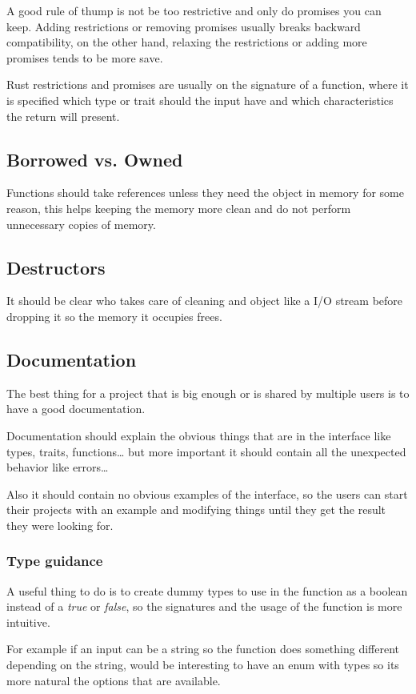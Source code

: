 A good rule of thump is not be too restrictive and only do promises you can keep.
Adding restrictions or removing promises usually breaks backward compatibility,
on the other hand, relaxing the restrictions or adding more promises tends to be more save.

Rust restrictions and promises are usually on the signature of a function,
where it is specified which type or trait should the input have and which characteristics the return will present.

\subsection{Borrowed vs. Owned}

Functions should take references unless they need the object in memory for some reason,
this helps keeping the memory more clean and do not perform unnecessary copies of memory.

\subsection{Destructors}

It should be clear who takes care of cleaning and object like a I/O stream before dropping it so the memory it occupies frees.

\subsection{Documentation}

The best thing for a project that is big enough or is shared by multiple users is to have a good documentation.

Documentation should explain the obvious things that are in the interface like types, traits, functions…
but more important it should contain all the unexpected behavior like errors…

Also it should contain no obvious examples of the interface,
so the users can start their projects with an example and modifying things until they get the result they were looking for.

\subsubsection{Type guidance}

A useful thing to do is to create dummy types to use in the function as a boolean instead of a \textit{true} or \textit{false},
so the signatures and the usage of the function is more intuitive.

For example if an input can be a string so the function does something different depending on the string,
would be interesting to have an enum with types so its more natural the options that are available.